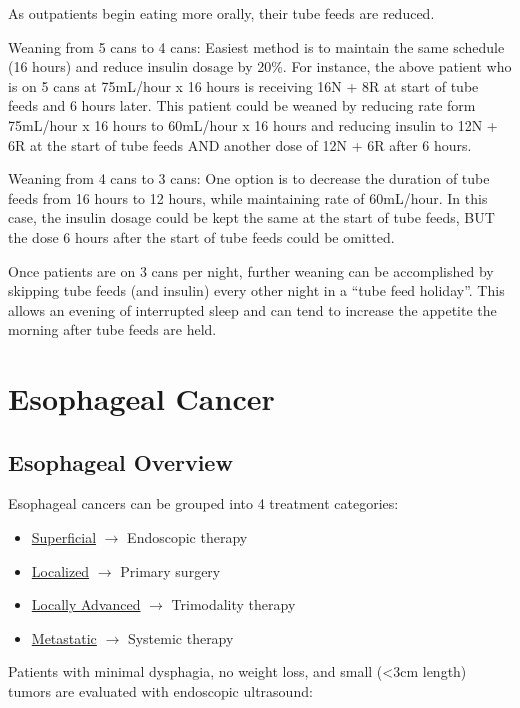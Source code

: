 \documentclass[
  letterpaper,
]{scrbook}
\providecommand{\tightlist}{%
  \setlength{\itemsep}{0pt}\setlength{\parskip}{0pt}}
\begin{document}
As outpatients begin eating more orally, their tube feeds are reduced.

Weaning from 5 cans to 4 cans: Easiest method is to maintain the same
schedule (16 hours) and reduce insulin dosage by 20\%. For instance, the
above patient who is on 5 cans at 75mL/hour x 16 hours is receiving 16N
+ 8R at start of tube feeds and 6 hours later. This patient could be
weaned by reducing rate form 75mL/hour x 16 hours to 60mL/hour x 16
hours and reducing insulin to 12N + 6R at the start of tube feeds AND
another dose of 12N + 6R after 6 hours.

Weaning from 4 cans to 3 cans: One option is to decrease the duration of
tube feeds from 16 hours to 12 hours, while maintaining rate of
60mL/hour. In this case, the insulin dosage could be kept the same at
the start of tube feeds, BUT the dose 6 hours after the start of tube
feeds could be omitted.

Once patients are on 3 cans per night, further weaning can be
accomplished by skipping tube feeds (and insulin) every other night in a
``tube feed holiday''. This allows an evening of interrupted sleep and
can tend to increase the appetite the morning after tube feeds are held.

\part{Esophageal Cancer}

\chapter{Esophageal Overview}\label{EsoIntro}

Esophageal cancers can be grouped into 4 treatment categories:

\begin{itemize}
\tightlist
\item
  \hyperref[superficial]{Superficial} \(\rightarrow\) Endoscopic therapy
\item
  \hyperref[localized]{Localized} \(\rightarrow\) Primary surgery
\item
  \hyperref[locally_advanced]{Locally Advanced} \(\rightarrow\)
  Trimodality therapy
\item
  \hyperref[metastatic]{Metastatic} \(\rightarrow\) Systemic therapy
\end{itemize}

Patients with minimal dysphagia, no weight loss, and small (\textless3cm
length) tumors are evaluated with endoscopic ultrasound:
\end{document}
